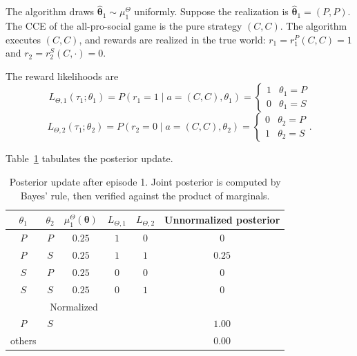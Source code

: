 \documentclass{article}
\begin{document}
The algorithm draws $\hat{\boldsymbol{\theta}}_1 \sim \mu_1^\Theta$ uniformly. Suppose the realization is $\hat{\boldsymbol{\theta}}_1 = (P, P)$. The CCE of the all-pro-social game is the pure strategy $(C, C)$. The algorithm executes $(C, C)$, and rewards are realized in the true world: $r_1 = r_1^P(C, C) = 1$ and $r_2 = r_2^S(C, \cdot) = 0$.

The reward likelihoods are
\begin{equation}
L_{\Theta,1}(\tau_1; \theta_1) = P(r_1 = 1 \mid a = (C,C), \theta_1) = \begin{cases} 1 & \theta_1 = P \\ 0 & \theta_1 = S \end{cases}
\end{equation}
\begin{equation}
L_{\Theta,2}(\tau_1; \theta_2) = P(r_2 = 0 \mid a = (C,C), \theta_2) = \begin{cases} 0 & \theta_2 = P \\ 1 & \theta_2 = S \end{cases}.
\end{equation}

Table~\ref{tab:posterior-update} tabulates the posterior update.

\begin{table}[ht]
\caption{Posterior update after episode 1. Joint posterior is computed by Bayes' rule, then verified against the product of marginals.}
\label{tab:posterior-update}
\begin{center}
\begin{tabular}{cccccc}
\toprule
$\theta_1$ & $\theta_2$ & $\mu_1^\Theta(\boldsymbol{\theta})$ & $L_{\Theta,1}$ & $L_{\Theta,2}$ & Unnormalized posterior \\
\midrule
$P$ & $P$ & $0.25$ & $1$ & $0$ & $0$ \\
$P$ & $S$ & $0.25$ & $1$ & $1$ & $0.25$ \\
$S$ & $P$ & $0.25$ & $0$ & $0$ & $0$ \\
$S$ & $S$ & $0.25$ & $0$ & $1$ & $0$ \\
\midrule
\multicolumn{3}{r}{Normalized} & & & \\
$P$ & $S$ & & & & $1.00$ \\
others & & & & & $0.00$ \\
\bottomrule
\end{tabular}
\end{center}
\end{table}
\end{document}
